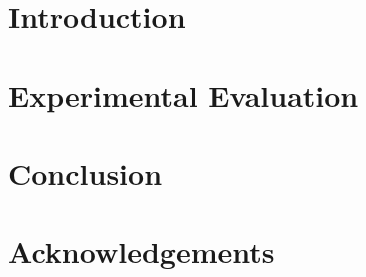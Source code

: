 



\maketitle
\thispagestyle{empty}

\begin{abstract}
    
\end{abstract}


\section{Introduction}




\section{Experimental Evaluation}



\section{Conclusion}


\section*{Acknowledgements}




{\small


}

 
